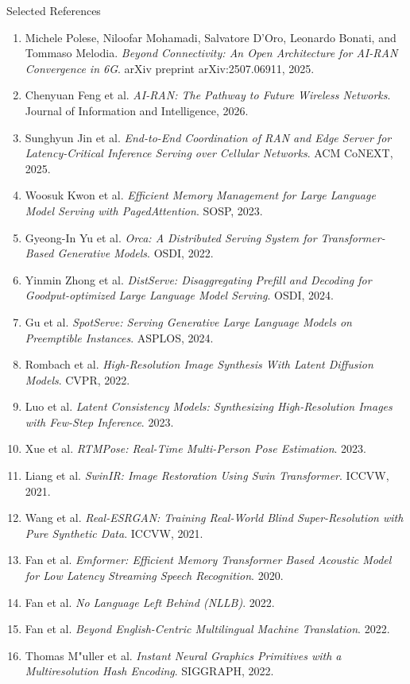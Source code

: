 \documentclass[aspectratio=169]{beamer}
\begin{document}
\begin{frame}[allowframebreaks]{Selected References}
\tiny
\begin{enumerate}
  \item Michele Polese, Niloofar Mohamadi, Salvatore D'Oro, Leonardo Bonati, and Tommaso Melodia. \emph{Beyond Connectivity: An Open Architecture for AI-RAN Convergence in 6G}. arXiv preprint arXiv:2507.06911, 2025.
  \item Chenyuan Feng et al. \emph{AI-RAN: The Pathway to Future Wireless Networks}. Journal of Information and Intelligence, 2026.
  \item Sunghyun Jin et al. \emph{End-to-End Coordination of RAN and Edge Server for Latency-Critical Inference Serving over Cellular Networks}. ACM CoNEXT, 2025.
  \item Woosuk Kwon et al. \emph{Efficient Memory Management for Large Language Model Serving with PagedAttention}. SOSP, 2023.
  \item Gyeong-In Yu et al. \emph{Orca: A Distributed Serving System for Transformer-Based Generative Models}. OSDI, 2022.
  \item Yinmin Zhong et al. \emph{DistServe: Disaggregating Prefill and Decoding for Goodput-optimized Large Language Model Serving}. OSDI, 2024.
  \item Gu et al. \emph{SpotServe: Serving Generative Large Language Models on Preemptible Instances}. ASPLOS, 2024.
  \item Rombach et al. \emph{High-Resolution Image Synthesis With Latent Diffusion Models}. CVPR, 2022.
  \item Luo et al. \emph{Latent Consistency Models: Synthesizing High-Resolution Images with Few-Step Inference}. 2023.
  \item Xue et al. \emph{RTMPose: Real-Time Multi-Person Pose Estimation}. 2023.
  \item Liang et al. \emph{SwinIR: Image Restoration Using Swin Transformer}. ICCVW, 2021.
  \item Wang et al. \emph{Real-ESRGAN: Training Real-World Blind Super-Resolution with Pure Synthetic Data}. ICCVW, 2021.
  \item Fan et al. \emph{Emformer: Efficient Memory Transformer Based Acoustic Model for Low Latency Streaming Speech Recognition}. 2020.
  \item Fan et al. \emph{No Language Left Behind (NLLB)}. 2022.
  \item Fan et al. \emph{Beyond English-Centric Multilingual Machine Translation}. 2022.
  \item Thomas M{"u}ller et al. \emph{Instant Neural Graphics Primitives with a Multiresolution Hash Encoding}. SIGGRAPH, 2022.
\end{enumerate}
\end{frame}
\end{document}
